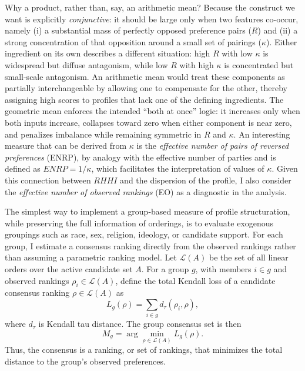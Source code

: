 \documentclass[12pt]{article}
\begin{document}
Why a product, rather than, say, an arithmetic mean? Because the construct we
want is explicitly \emph{conjunctive}: it should be large only when two features
co-occur, namely (i) a substantial mass of perfectly opposed preference pairs
($R$) and (ii) a strong concentration of that opposition around a small set of
pairings ($\kappa$). Either ingredient on its own describes a different situation:
high $R$ with low $\kappa$ is widespread but diffuse antagonism, while low $R$ with
high $\kappa$ is concentrated but small-scale antagonism. An arithmetic mean would
treat these components as partially interchangeable by allowing one to
compensate for the other, thereby assigning high scores to profiles that lack
one of the defining ingredients. The geometric mean enforces the intended ``both
at once'' logic: it increases only when both inputs increase, collapses toward
zero when either component is near zero, and penalizes imbalance while remaining
symmetric in $R$ and $\kappa$. An interesting measure that can be derived from \(\kappa\) is the  \emph{effective number of pairs of reversed preferences} (ENRP), by analogy with the effective number of parties \parencite{shugart2017votes} and is defined as \(ENRP = 1/\kappa\), which facilitates the interpretation of values of \(\kappa\). Given this connection between \(RHHI\) and the dispersion of the profile, I also consider the \emph{effective number of observed rankings} (EO) as a diagnostic in the analysis.




The simplest way to implement a group-based measure of profile structuration, while preserving the full information of orderings, is to evaluate exogenous groupings such as race, sex, religion, ideology, or candidate support. For each group, I estimate a consensus ranking directly from the observed rankings rather than assuming a parametric ranking model. Let \(\mathcal{L}(A)\) be the set of all linear orders over the active candidate set \(A\). For a group \(g\), with members \(i \in g\) and observed rankings \(\rho_i \in \mathcal{L}(A)\), define the total Kendall loss of a candidate consensus ranking \(\rho \in \mathcal{L}(A)\) as
\[
L_g(\rho) = \sum_{i \in g} d_{\tau}(\rho_i,\rho),
\]
where \(d_{\tau}\) is Kendall tau distance. The group consensus set is then
\[
M_g = \arg\min_{\rho \in \mathcal{L}(A)} L_g(\rho).
\]
Thus, the consensus is  a ranking, or set of rankings, that minimizes the total distance to the group's observed preferences.
\end{document}
